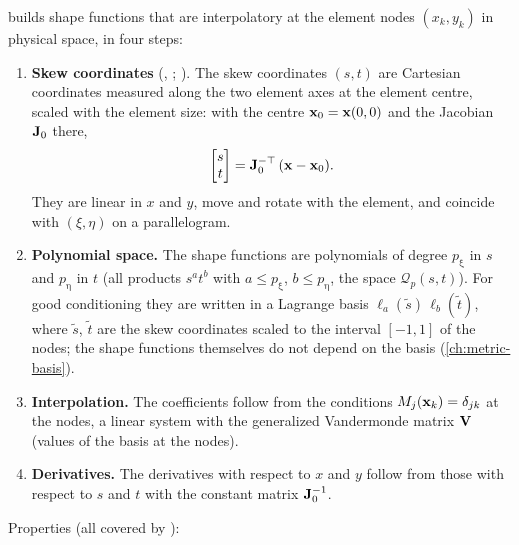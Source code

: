  builds shape functions that
are interpolatory at the element nodes $(x_k,y_k)$ in physical space, in four
steps:
\begin{enumerate}
  \item \textbf{Skew coordinates} (,
    \cite{Xie2016Modified}; \cite{Yuan1993New}). The skew coordinates $(s,t)$
    are Cartesian coordinates measured along the two element axes at the element
    centre, scaled with the element size: with the centre
    $\mathbf{x}_0 = \mathbf{x}(0,0)$ and the Jacobian $\mathbf{J}_0$ there,
    \begin{equation}
      \begin{bmatrix} s\\ t\end{bmatrix} = \mathbf{J}_0^{-\top}\,(\mathbf{x} - \mathbf{x}_0).
    \end{equation}
    They are linear in $x$ and $y$, move and rotate with the element, and
    coincide with $(\xi,\eta)$ on a parallelogram.
  \item \textbf{Polynomial space.} The shape functions are polynomials of degree
    $p_\upxi$ in $s$ and $p_\upeta$ in $t$ (all products $s^a t^b$ with $a\le
    p_\upxi$, $b\le p_\upeta$, the space $\mathcal Q_p(s,t)$). For good conditioning they
    are written in a Lagrange basis $\ell_a(\tilde s)\,\ell_b(\tilde t)$, where
    $\tilde s$, $\tilde t$ are the skew coordinates scaled to the interval
    $[-1,1]$ of the nodes; the shape functions themselves do not depend on the
    basis (\cref{ch:metric-basis}).
  \item \textbf{Interpolation.} The coefficients follow from the conditions
    $M_j(\mathbf{x}_k) = \delta_{jk}$ at the nodes, a linear system with the
    generalized Vandermonde matrix $\mathbf{V}$ (values of the basis at the nodes).
  \item \textbf{Derivatives.} The derivatives with respect to $x$ and $y$
    follow from those with respect to $s$ and $t$ with the constant matrix
    $\mathbf{J}_0^{-1}$.
\end{enumerate}
Properties (all covered by ):
